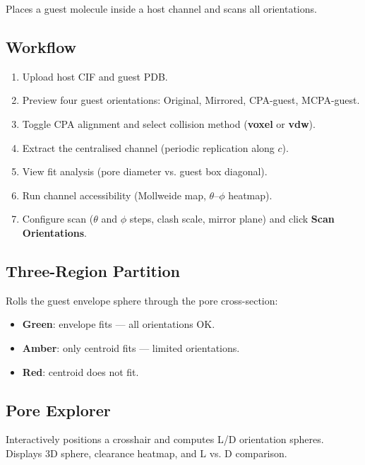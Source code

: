 \documentclass[11pt,a4paper]{article}
\begin{document}
Places a guest molecule inside a host channel and scans all orientations.

\subsection{Workflow}

\begin{enumerate}
    \item Upload host CIF and guest PDB.
    \item Preview four guest orientations: Original, Mirrored,
          CPA-guest, MCPA-guest.
    \item Toggle CPA alignment and select collision method
          (\textbf{voxel} or \textbf{vdw}).
    \item Extract the centralised channel (periodic replication along $c$).
    \item View fit analysis (pore diameter vs. guest box diagonal).
    \item Run channel accessibility (Mollweide map, $\theta$--$\phi$
          heatmap).
    \item Configure scan ($\theta$ and $\phi$ steps, clash scale,
          mirror plane) and click \textbf{Scan Orientations}.
\end{enumerate}

\subsection{Three-Region Partition}

Rolls the guest envelope sphere through the pore cross-section:

\begin{itemize}
    \item \textbf{Green}: envelope fits --- all orientations OK.
    \item \textbf{Amber}: only centroid fits --- limited orientations.
    \item \textbf{Red}: centroid does not fit.
\end{itemize}

\subsection{Pore Explorer}

Interactively positions a crosshair and computes L/D orientation spheres.
Displays 3D sphere, clearance heatmap, and L vs. D comparison.

\end{document}
